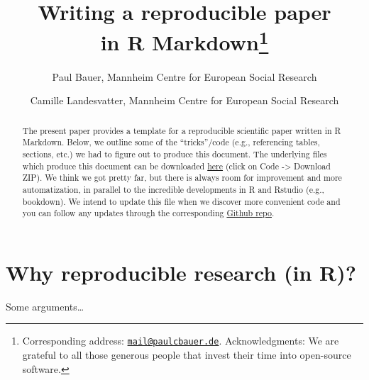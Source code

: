 \documentclass[
  12pt,
]{article}
\title{\hfill\break
\vspace{0.7cm}Writing a reproducible paper\\
in R Markdown\footnote{Corresponding address: \href{mailto:mail@paulcbauer.de}{\nolinkurl{mail@paulcbauer.de}}. Acknowledgments: We are grateful to all those generous people that invest their time into open-source software.}\vspace{0.5cm}\\}
\author{Paul Bauer, Mannheim Centre for European Social Research \and Camille Landesvatter, Mannheim Centre for European Social Research}
\date{\hfill\break
First version: December 14, 2018\\
This version: June 19, 2023\\
Download this Paper on OSF: \url{https://osf.io/q395s}\\
\strut \\
Feedback? Errors? \href{mailto:mail@paulcbauer.de}{\nolinkurl{mail@paulcbauer.de}}\\
\href{https://github.com/paulcbauer/Writing_a_reproducable_paper_in_rmarkdown/}{Github repository}\\
\strut \\
Tired of Latex?\\
Try \href{https://github.com/rstudio/pagedown}{Pagedown} with our \href{https://osf.io/k8jhx/}{new template}! :-)}
\begin{document}
\maketitle
\begin{abstract}
\noindent{}The present paper provides a template for a reproducible scientific paper written in R Markdown. Below, we outline some of the ``tricks''/code (e.g., referencing tables, sections, etc.) we had to figure out to produce this document. The underlying files which produce this document can be downloaded \href{https://github.com/paulcbauer/Writing_a_reproducable_paper_in_rmarkdown}{here} (click on Code -\textgreater{} Download ZIP). We think we got pretty far, but there is always room for improvement and more automatization, in parallel to the incredible developments in R and Rstudio (e.g., bookdown). We intend to update this file when we discover more convenient code and you can follow any updates through the corresponding \href{https://github.com/paulcbauer/Writing_a_reproducable_paper_in_rmarkdown/}{Github repo}.\vspace{.8cm}
\end{abstract}

\clearpage

\renewcommand{\baselinestretch}{0.5}\normalsize
\tableofcontents
\renewcommand{\baselinestretch}{1.1}\normalsize

\clearpage

\hypertarget{why-reproducible-research-in-r}{%
\section{Why reproducible research (in R)?}\label{why-reproducible-research-in-r}}

Some arguments\ldots{}
\end{document}
